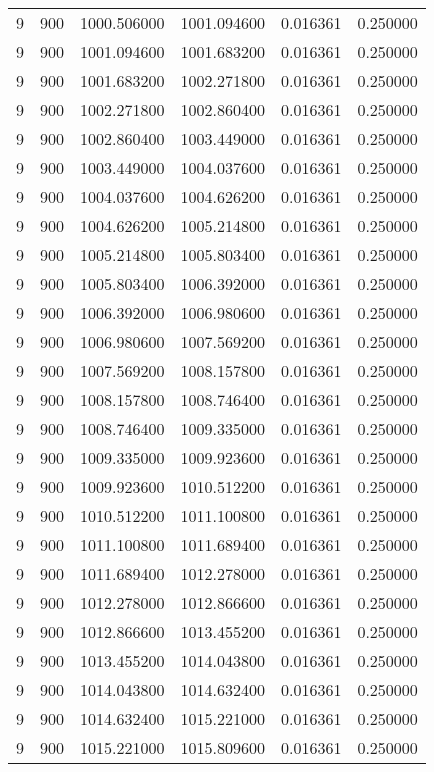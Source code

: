 \begin{longtable}{rrrrrr}
9 & 900 & 1000.506000 & 1001.094600 & 0.016361 & 0.250000 \\
9 & 900 & 1001.094600 & 1001.683200 & 0.016361 & 0.250000 \\
9 & 900 & 1001.683200 & 1002.271800 & 0.016361 & 0.250000 \\
9 & 900 & 1002.271800 & 1002.860400 & 0.016361 & 0.250000 \\
9 & 900 & 1002.860400 & 1003.449000 & 0.016361 & 0.250000 \\
9 & 900 & 1003.449000 & 1004.037600 & 0.016361 & 0.250000 \\
9 & 900 & 1004.037600 & 1004.626200 & 0.016361 & 0.250000 \\
9 & 900 & 1004.626200 & 1005.214800 & 0.016361 & 0.250000 \\
9 & 900 & 1005.214800 & 1005.803400 & 0.016361 & 0.250000 \\
9 & 900 & 1005.803400 & 1006.392000 & 0.016361 & 0.250000 \\
9 & 900 & 1006.392000 & 1006.980600 & 0.016361 & 0.250000 \\
9 & 900 & 1006.980600 & 1007.569200 & 0.016361 & 0.250000 \\
9 & 900 & 1007.569200 & 1008.157800 & 0.016361 & 0.250000 \\
9 & 900 & 1008.157800 & 1008.746400 & 0.016361 & 0.250000 \\
9 & 900 & 1008.746400 & 1009.335000 & 0.016361 & 0.250000 \\
9 & 900 & 1009.335000 & 1009.923600 & 0.016361 & 0.250000 \\
9 & 900 & 1009.923600 & 1010.512200 & 0.016361 & 0.250000 \\
9 & 900 & 1010.512200 & 1011.100800 & 0.016361 & 0.250000 \\
9 & 900 & 1011.100800 & 1011.689400 & 0.016361 & 0.250000 \\
9 & 900 & 1011.689400 & 1012.278000 & 0.016361 & 0.250000 \\
9 & 900 & 1012.278000 & 1012.866600 & 0.016361 & 0.250000 \\
9 & 900 & 1012.866600 & 1013.455200 & 0.016361 & 0.250000 \\
9 & 900 & 1013.455200 & 1014.043800 & 0.016361 & 0.250000 \\
9 & 900 & 1014.043800 & 1014.632400 & 0.016361 & 0.250000 \\
9 & 900 & 1014.632400 & 1015.221000 & 0.016361 & 0.250000 \\
9 & 900 & 1015.221000 & 1015.809600 & 0.016361 & 0.250000 \\

\end{longtable}
